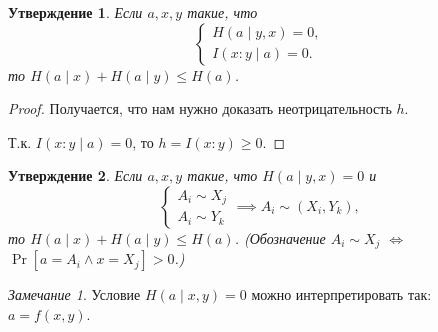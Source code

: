 \documentclass[12pt]{article}
\theoremstyle{definition}
\theoremstyle{plain}
\newtheorem{statement}{Утверждение}[section]
\theoremstyle{remark}
\newtheorem{remark}{Замечание}[section]
\begin{document}
\begin{statement}
    Если $a,x,y$ такие, что
\[
    \begin{cases}
        H(a\mid y,x) = 0,\\
        I(x:y\mid a) = 0.
    \end{cases}
\]
то  \(H(a\mid x) + H(a\mid y) \le H(a)\).
\end{statement}
\begin{proof}
    Получается, что нам нужно доказать неотрицательность $h$. 
    \begin{center}
    \end{center}
Т.к. $I(x:y\mid a) = 0$, то $h = I(x:y)\ge 0$.
\end{proof}
\begin{statement}
    Если $a,x,y$ такие, что $H(a\mid y,x) = 0$ и
\[
    \begin{cases}
        A_i \sim X_j\\
        A_i \sim Y_k
    \end{cases} \implies A_i\sim(X_i,Y_k),
\]
то  \(H(a\mid x) + H(a\mid y) \le H(a)\). (Обозначение $A_i\sim X_j$ $\iff$ $\Pr[a=A_i \land x=X_j]>0$.)
\end{statement}
\begin{remark}
    Условие $H(a\mid x,y) = 0$ можно интерпретировать так: $a = f(x,y)$.
\end{remark}
\end{document}
